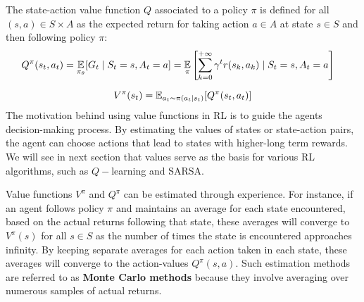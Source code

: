 \begin{definition}
    The state-action value function $Q$ associated to a policy $\pi$ is defined for all $(s,a) \in S \times A$ as the expected return for taking action $a \in A$ at state $s \in S$ and then following policy $\pi$:
    \begin{align*}
    Q^{\pi}(s_t,a_t) &=  \underset{\pi_{\theta}}{\mathbb E} [G_t \mid S_t =s, A_t = a]  = \underset{\pi}{\mathbb E}
    \left [
    \sum_{k =0}^{+ \infty} \gamma^t r(s_{k}, a_k) \mid S_t = s, A_t = a \right ]
    \end{align*}
\end{definition}
$$
V^{\pi}(s_t) = \mathbb E_{a_t \sim \pi(a_t \mid s_t)}[Q^{\pi}(s_t, a_t)]
$$
The motivation behind using value functions in RL is to guide the agents decision-making process. By estimating the values of states or state-action pairs, the agent can choose actions that lead to states with higher-long term rewards. We will see in next section that values serve as the basis for various RL algorithms, such as $Q-$learning and SARSA.

Value functions $V^{\pi}$ and $Q^{\pi}$ can be estimated through experience. For instance, if an agent follows policy $\pi$ and maintains an average for each state encountered, based on the actual returns following that state, these averages will converge to $V^{\pi}(s)$ for all $s \in S$ as the number of times the state is encountered approaches infinity.
By keeping separate averages for each action taken in each state, these averages will converge to the action-values $Q^{\pi}(s,a)$. Such estimation methods are referred to as \textbf{Monte Carlo methods} because they involve averaging over numerous samples of actual returns.
